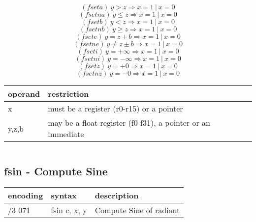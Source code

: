 \documentclass[letterpaper,10pt,openright,twoside,onecolumn]{book}
\begin{document}
  \begin{displaymath} (fseta)\ y > z \Rightarrow x = 1\ |\ x = 0\end{displaymath}
  \begin{displaymath} (fsetna)\ y \leq z \Rightarrow x = 1\ |\ x = 0\end{displaymath}
  \begin{displaymath} (fsetb)\ y < z \Rightarrow x = 1\ |\ x = 0\end{displaymath}
  \begin{displaymath} (fsetnb)\ y \geq z \Rightarrow x = 1\ |\ x = 0\end{displaymath}
  \begin{displaymath} (fsete)\ y = z\pm b \Rightarrow x = 1\ |\ x = 0\end{displaymath}
  \begin{displaymath} (fsetne)\ y \neq z\pm b \Rightarrow x = 1\ |\ x = 0\end{displaymath}
  \begin{displaymath} (fseti)\ y = +\infty \Rightarrow x = 1\ |\ x = 0\end{displaymath}
  \begin{displaymath} (fsetni)\ y = -\infty \Rightarrow x = 1\ |\ x = 0\end{displaymath}
  \begin{displaymath} (fsetz)\ y = +0 \Rightarrow x = 1\ |\ x = 0\end{displaymath}
  \begin{displaymath} (fsetnz)\ y = -0 \Rightarrow x = 1\ |\ x = 0\end{displaymath}

  \flushleft
  \begin{tabular}{|l|l|}
   \hline
    operand & restriction \\
   \hline
    x & must be a register (r0-r15) or a pointer \\
    y,z,b & may be a float register (f0-f31), a pointer or an immediate \\
   \hline
  \end{tabular}

  \begin{verbatim}
  \end{verbatim}
\newpage\subsection{fsin - Compute Sine}
  \begin{tabular}{|l|l|l|}
   \hline
    encoding & syntax & description \\
   \hline
    /3 071 & fsin c, x, y & Compute Sine of radiant\\
   \hline
  \end{tabular}
\end{document}
